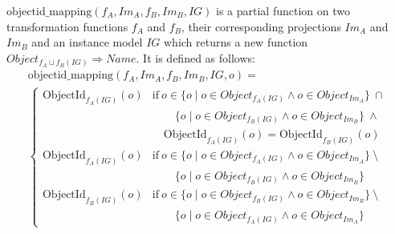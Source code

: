 \begin{defin}
\label{defin:transformation_framework:instance_models_and_instance_graphs:combining_transformation_functions:objectid_mapping}
$\mathrm{objectid\_\!mapping}(f_A, Im_A, f_B, Im_B, IG)$ is a partial function on two transformation functions $f_A$ and $f_B$, their corresponding projections $Im_A$ and $Im_B$ and an instance model $IG$ which returns a new function $Object_{f_{A} \sqcup f_{B}(IG)} \Rightarrow Name$. It is defined as follows:
\begin{multline*}
    \mathrm{objectid\_\!mapping}(f_A, Im_A, f_B, Im_B, IG, o) = \\
    \begin{cases}
        \mathrm{ObjectId}_{f_{A}(IG)}(o) & \mathrm{if }\ o \in \{o \mid o \in Object_{f_{A}(IG)} \land o \in Object_{Im_A} \}\ \cap \\&\qquad\{o \mid o \in Object_{f_{B}(IG)} \land o \in Object_{Im_B} \}\ \land \\&\quad \mathrm{ObjectId}_{f_{A}(IG)}(o) = \mathrm{ObjectId}_{f_{B}(IG)}(o) \\
        \mathrm{ObjectId}_{f_{A}(IG)}(o) & \mathrm{if }\ o \in \{o \mid o \in Object_{f_{A}(IG)} \land o \in Object_{Im_A} \}\ \setminus \\&\qquad\{o \mid o \in Object_{f_{B}(IG)} \land o \in Object_{Im_B} \} \\
        \mathrm{ObjectId}_{f_{B}(IG)}(o) & \mathrm{if }\ o \in \{o \mid o \in Object_{f_{B}(IG)} \land o \in Object_{Im_B} \}\ \setminus \\&\qquad\{o \mid o \in Object_{f_{A}(IG)} \land o \in Object_{Im_A} \}
    \end{cases}
\end{multline*}
\end{defin}


